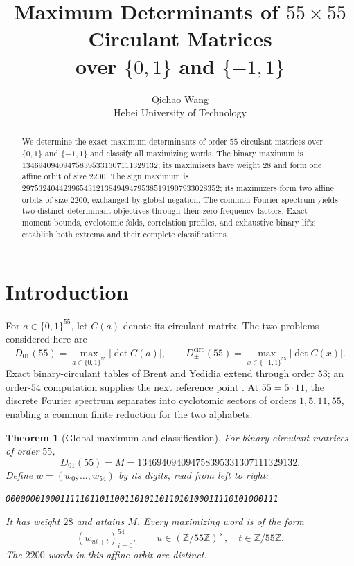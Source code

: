 \documentclass[11pt,a4paper]{article}
\title{Maximum Determinants of $55\times55$ Circulant Matrices\\over $\{0,1\}$ and $\{-1,1\}$}
\author{
  Qichao Wang\\
  Hebei University of Technology
}
\date{}
\newtheorem{theorem}{Theorem}
\theoremstyle{remark}
\newcommand{\Z}{\mathbb Z}
\newcommand{\M}{134694094094758395331307111329132}
\begin{document}
\maketitle

\begin{abstract}
We determine the exact maximum determinants of order-$55$ circulant
matrices over $\{0,1\}$ and $\{-1,1\}$ and classify all maximizing
words.  The binary maximum is
$134694094094758395331307111329132$; its maximizers have weight $28$
and form one affine orbit of size $2200$.  The sign maximum is
$297532404423965431213849494795385191907933028352$; its
maximizers form two affine orbits of size $2200$, exchanged by global
negation.  The common Fourier spectrum yields two distinct determinant
objectives through their zero-frequency factors.  Exact moment
bounds, cyclotomic folds, correlation profiles, and exhaustive binary
lifts establish both extrema and their complete classifications.
\end{abstract}

\section{Introduction}

For $a\in\{0,1\}^{55}$, let $C(a)$ denote its circulant
matrix.  The two problems considered here are
\[
 D_{01}(55)=\max_{a\in\{0,1\}^{55}}|\det C(a)|,\qquad
 D_{\pm}^{\mathrm{circ}}(55)=
       \max_{x\in\{-1,1\}^{55}}|\det C(x)|.
\]
Exact binary-circulant tables of Brent and Yedidia extend through
order $53$; an order-$54$ computation supplies the next reference
point \cite{brent-yedidia,aletheia54}.
At $55=5\cdot11$, the discrete Fourier spectrum separates into
cyclotomic sectors of orders $1,5,11,55$, enabling a common
finite reduction for the two alphabets.

\begin{theorem}[Global maximum and classification]
\label{thm:main}
For binary circulant matrices of order $55$,
\[
  D_{01}(55)=M=\M.
\]
Define $w=(w_0,\ldots,w_{54})$ by its digits, read from left to right:
\begin{center}
\texttt{0000000100011111011011001101011011010100011110101000111}
\end{center}
It has weight $28$ and attains $M$. Every maximizing word is of the form
\[
 (w_{ui+t})_{i=0}^{54},
 \qquad u\in(\Z/55\Z)^\times,\quad t\in\Z/55\Z.
\]
The $2200$ words in this affine orbit are distinct.
\end{theorem}
\end{document}
